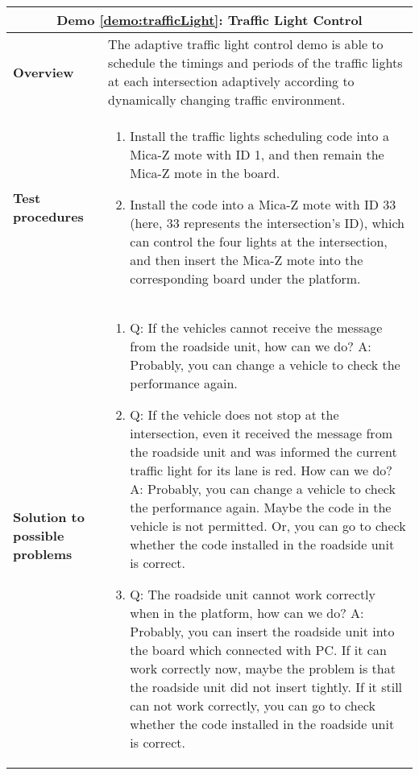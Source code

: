 \begin{center}
	\begin{tabular}{ | p{2cm} | p{10cm} | }
		\hline
		\multicolumn{2}{|c|}{\textbf{Demo \ref{demo:trafficLight}: Traffic Light Control}} \\ \hline
		\textbf{Overview} &  The adaptive traffic light control demo is able to schedule the timings and periods of the traffic lights at each intersection adaptively according to dynamically changing traffic environment. \\ \hline
		\textbf{Test procedures} &
		\begin{enumerate}
		\item Install the traffic lights scheduling code into a Mica-Z mote with ID 1, and then remain the Mica-Z mote in the board. 
		\item	Install the code into a Mica-Z mote with ID 33 (here, 33 represents the intersection's ID), which can control the four lights at the intersection, and then insert the Mica-Z mote into the corresponding board under the platform.
		\end{enumerate} \\ \hline
		\textbf{Solution to possible problems} &
		\begin{enumerate}
		\item Q: If the vehicles cannot receive the message from the roadside unit, how can we do?
		A: Probably, you can change a vehicle to check the performance again.
		\item Q: If the vehicle does not stop at the intersection, even it received the message from the roadside unit and was informed the current traffic light for its lane is red. How can we do?
		A: Probably, you can change a vehicle to check the performance again. Maybe the code in the vehicle is not permitted. Or, you can go to check whether the code installed in the roadside unit is correct.
		\item Q: The roadside unit cannot work correctly when in the platform, how can we do?
		A: Probably, you can insert the roadside unit into the board which connected with PC. If it can work correctly now, maybe the problem is that the roadside unit did not insert tightly.  If it still can not work correctly, you can go to check whether the code installed in the roadside unit is correct.
		\end{enumerate}  \\
		\hline
	\end{tabular}
\end{center}

